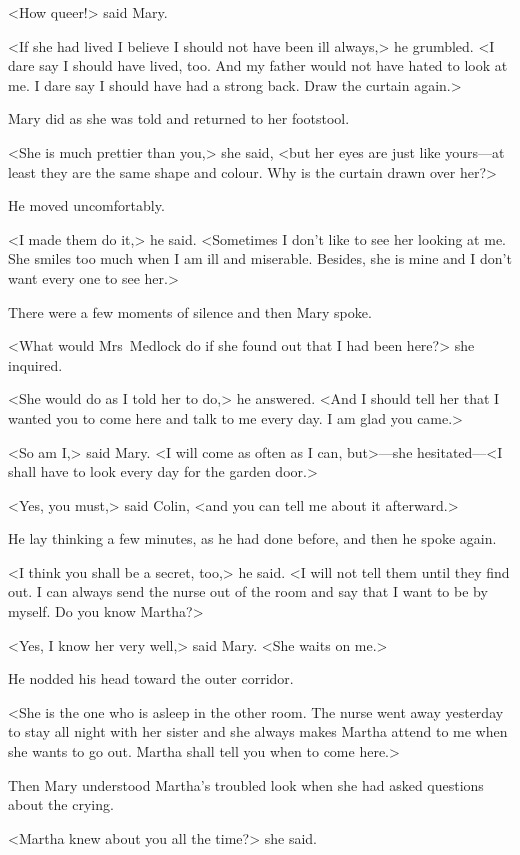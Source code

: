 <How queer!> said Mary.

<If she had lived I believe I should not have been ill always,> he grumbled. <I dare say I should have lived, too. And my father would not have hated to look at me. I dare say I should have had a strong back. Draw the curtain again.>

Mary did as she was told and returned to her footstool.

<She is much prettier than you,> she said, <but her eyes are just like yours—at least they are the same shape and colour. Why is the curtain drawn over her?>

He moved uncomfortably.

<I made them do it,> he said. <Sometimes I don't like to see her looking at me. She smiles too much when I am ill and miserable. Besides, she is mine and I don't want every one to see her.>

There were a few moments of silence and then Mary spoke.

<What would Mrs~Medlock do if she found out that I had been here?> she inquired.

<She would do as I told her to do,> he answered. <And I should tell her that I wanted you to come here and talk to me every day. I am glad you came.>

<So am I,> said Mary. <I will come as often as I can, but>—she hesitated—<I shall have to look every day for the garden door.>

<Yes, you must,> said Colin, <and you can tell me about it afterward.>

He lay thinking a few minutes, as he had done before, and then he spoke again.

<I think you shall be a secret, too,> he said. <I will not tell them until they find out. I can always send the nurse out of the room and say that I want to be by myself. Do you know Martha?>

<Yes, I know her very well,> said Mary. <She waits on me.>

He nodded his head toward the outer corridor.

<She is the one who is asleep in the other room. The nurse went away yesterday to stay all night with her sister and she always makes Martha attend to me when she wants to go out. Martha shall tell you when to come here.>

Then Mary understood Martha's troubled look when she had asked questions about the crying.

<Martha knew about you all the time?> she said.

